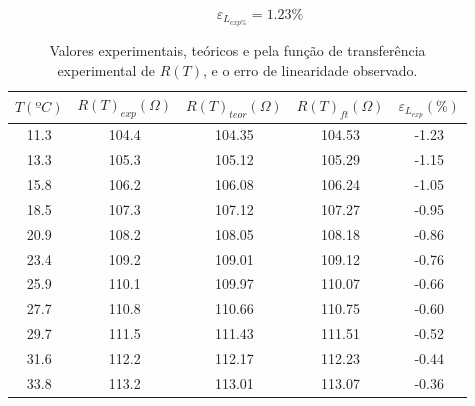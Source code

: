 \documentclass[a4paper]{instrumentacao}
\begin{document}
\begin{equation}
	\varepsilon_{L_{exp\%}}=1.23\%
	\label{eq:pt100-erro-linearidade-experimental}
\end{equation}

\begin{table}[H]
\centering
\caption{Valores experimentais, teóricos e pela função de transferência experimental de $R(T)$, e o erro de linearidade observado.}
\label{tab:pt100-exp-teorico-tf-erro}
\begin{tabular}{|c|c|c|c|c|}
\hline
\textbf{$T(ºC)$} & \textbf{$R(T)_{exp}(\Omega)$} & \textbf{$R(T)_{teor}(\Omega)$} & \textbf{$R(T)_{ft}(\Omega)$} & \textbf{$\varepsilon_{L_{exp}}(\%)$} \\ \hline
11.3           & 104.4                 & 104.35                     & 104.53                & -1.23                        \\ \hline
13.3           & 105.3                 & 105.12                     & 105.29                & -1.15                        \\ \hline
15.8           & 106.2                 & 106.08                     & 106.24                & -1.05                        \\ \hline
18.5           & 107.3                 & 107.12                     & 107.27                & -0.95                        \\ \hline
20.9           & 108.2                 & 108.05                     & 108.18                & -0.86                        \\ \hline
23.4           & 109.2                 & 109.01                     & 109.12                & -0.76                        \\ \hline
25.9           & 110.1                 & 109.97                     & 110.07                & -0.66                        \\ \hline
27.7           & 110.8                 & 110.66                     & 110.75                & -0.60                        \\ \hline
29.7           & 111.5                 & 111.43                     & 111.51                & -0.52                        \\ \hline
31.6           & 112.2                 & 112.17                     & 112.23                & -0.44                        \\ \hline
33.8           & 113.2                 & 113.01                     & 113.07                & -0.36                        \\ \hline

\end{tabular}
\end{table}
\end{document}
